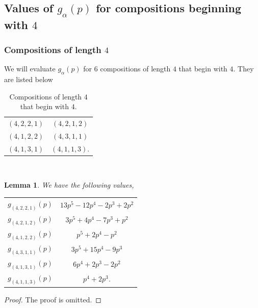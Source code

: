 \documentclass[a4paper]{amsart}
\newtheorem{lemma}[theorem]{Lemma}
\numberwithin{equation}{section}
\theoremstyle{remark}
\begin{document}
\subsection{Values of $g_\alpha(p)$ for compositions beginning with $4$}
\subsubsection{Compositions of length $4$}We will evaluate $g_{\alpha}(p)$ for $6$ compositions of length $4$ that begin with $4$. They are listed below\\
\begin{table}[h!]
\centering
\begin{tabular}{c c } 
\hline
$(4,2,2,1)$ & $(4,2,1,2)$\\ 
$(4,1,2,2)$ & $(4,3,1,1)$\\
$(4,1,3,1)$ & $(4,1,1,3)$.\\
\hline
\end{tabular}
\caption{Compositions of length $4$ that begin with $4$.}
\end{table}\\
\begin{lemma}
We have the following values,
\begin{table}[H]
\centering
 \begin{tabular}{c c } 
 \hline
 $g_{(4,2,2,1)}(p)$ & $13p^5-12p^4-2p^3+2p^2$\\ 
 $g_{(4,2,1,2)}(p)$ & $3p^5+4p^4-7p^3+p^2$\\
 $g_{(4,1,2,2)}(p)$ & $p^5 + 2 p^4 - p^2$\\
 $g_{(4,3,1,1)}(p)$ & $3p^5+15p^4-9p^3$\\
 $g_{(4,1,3,1)}(p)$ & $6p^4+2p^3-2p^2$\\
 $g_{(4,1,1,3)}(p)$ & $p^4+2p^3$.\\
\hline
\end{tabular}
\end{table}
\end{lemma}
\begin{proof}
The proof is omitted.
\end{proof}
\end{document}
